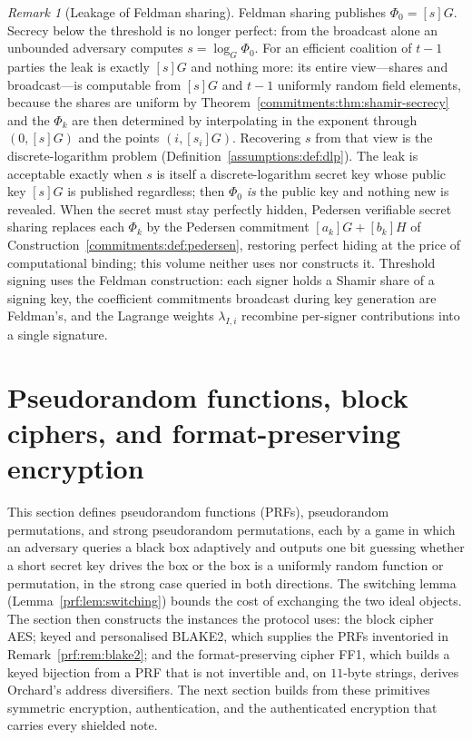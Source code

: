 \documentclass[11pt,a4paper]{article}
\theoremstyle{definition}
\renewcommand{\sectionmark}[1]{\markboth{\thesection\ \ #1}{}}
\theoremstyle{remark}
\newtheorem{remark}[theorem]{Remark}
\begin{document}
\begin{remark}[Leakage of Feldman sharing]
\label{commitments:rem:feldman-leak}
Feldman sharing publishes \(\Phi_0 = [s]G\). Secrecy below the
threshold is no longer perfect: from the broadcast alone an
unbounded adversary computes \(s = \log_G \Phi_0\). For an efficient
coalition of \(t - 1\) parties the leak is exactly \([s]G\) and
nothing more: its entire view---shares and broadcast---is computable
from \([s]G\) and \(t - 1\) uniformly random field elements, because
the shares are uniform by
Theorem~\ref{commitments:thm:shamir-secrecy} and the \(\Phi_k\) are
then determined by interpolating in the exponent through
\((0, [s]G)\) and the points \((i, [s_i]G)\). Recovering \(s\) from
that view is the discrete-logarithm problem
(Definition~\ref{assumptions:def:dlp}). The leak is acceptable
exactly when \(s\) is itself a discrete-logarithm secret key whose
public key \([s]G\) is published regardless; then \(\Phi_0\) \emph{is}
the public key and nothing new is revealed. When the secret must stay
perfectly hidden, Pedersen verifiable secret sharing replaces each
\(\Phi_k\) by the Pedersen commitment \([a_k]G + [b_k]H\) of
Construction~\ref{commitments:def:pedersen}, restoring perfect
hiding at the price of computational binding; this volume neither uses
nor constructs it. Threshold signing uses the Feldman
construction: each signer holds a Shamir share
of a signing key, the coefficient commitments broadcast during key
generation are Feldman's, and the Lagrange weights \(\lambda_{I,i}\)
recombine per-signer contributions into a single signature.
\end{remark}

\section{Pseudorandom functions, block ciphers, and format-preserving
encryption}\label{sec:prf}
\sectionmark{Pseudorandom functions and block ciphers}

This section defines pseudorandom functions (PRFs), pseudorandom
permutations, and strong pseudorandom permutations, each by a game in which an
adversary queries a black box adaptively and outputs one bit guessing
whether a short secret key drives the box or the box is a uniformly
random function or permutation, in the strong case queried in both
directions. The switching lemma (Lemma~\ref{prf:lem:switching}) bounds
the cost of exchanging the two ideal objects. The section then
constructs the instances the protocol uses: the block cipher AES; keyed
and personalised BLAKE2, which supplies the PRFs inventoried in
Remark~\ref{prf:rem:blake2}; and the format-preserving cipher FF1, which
builds a keyed bijection from a PRF that is not invertible and, on
\(11\)-byte strings, derives Orchard's address diversifiers. The next
section builds from these primitives symmetric encryption,
authentication, and the authenticated encryption that carries every
shielded note.
\end{document}
